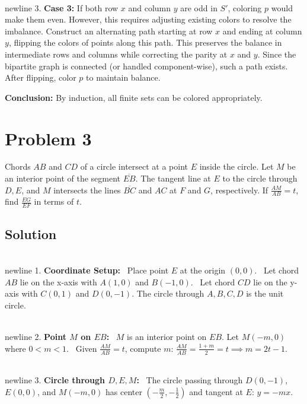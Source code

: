 \documentclass{article}
\begin{document}
\\newline 3. \textbf{Case 3:} If both row \( x \) and column \( y \) are odd in \( S' \), coloring \( p \) would make them even. However, this requires adjusting existing colors to resolve the imbalance. Construct an alternating path starting at row \( x \) and ending at column \( y \), flipping the colors of points along this path. This preserves the balance in intermediate rows and columns while correcting the parity at \( x \) and \( y \). Since the bipartite graph is connected (or handled component-wise), such a path exists. After flipping, color \( p \) to maintain balance.

\textbf{Conclusion:} By induction, all finite sets can be colored appropriately.
\hrulefill
\newpage
\section*{Problem 3}
Chords \(AB\) and \(CD\) of a circle intersect at a point \(E\) inside the circle. Let \(M\) be an interior point of the segment \(\overline{EB}\). The tangent line at \(E\) to the circle through \(D, E\), and \(M\) intersects the lines \(\overline{BC}\) and \({AC}\) at \(F\) and \(G\), respectively.
If  \(\frac{AM}{AB} = t\), find \(\frac{EG}{EF}\) in terms of \(t\).

\subsection*{Solution}
\\newline 1. \textbf{Coordinate Setup:}
\noindent \textbullet\ Place point \( E \) at the origin \((0,0)\).
\noindent \textbullet\ Let chord \( AB \) lie on the x-axis with \( A(1,0) \) and \( B(-1,0) \).
\noindent \textbullet\ Let chord \( CD \) lie on the y-axis with \( C(0,1) \) and \( D(0,-1) \). The circle through \( A, B, C, D \) is the unit circle.

\\newline 2. \textbf{Point \( M \) on \( EB \):}
\noindent \textbullet\ \( M \) is an interior point on \( EB \). Let \( M(-m,0) \) where \( 0 < m < 1 \).
\noindent \textbullet\ Given \( \frac{AM}{AB} = t \), compute \( m \):
     \(
     \frac{AM}{AB} = \frac{1 + m}{2} = t \implies m = 2t - 1.
     \)

\\newline 3. \textbf{Circle through \( D, E, M \):}
\noindent \textbullet\ The circle passing through \( D(0,-1) \), \( E(0,0) \), and \( M(-m,0) \) has center \(\left(-\frac{m}{2}, -\frac{1}{2}\right)\) and tangent at \( E \):
     \(
     y = -mx.
     \)
\end{document}
